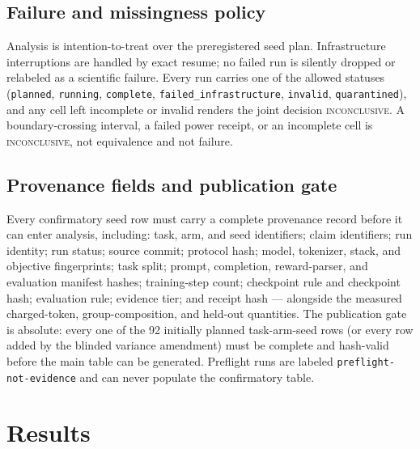 \documentclass[11pt]{article}
\begin{document}
\subsection{Failure and missingness policy}

Analysis is intention-to-treat over the preregistered seed plan. Infrastructure interruptions are handled by exact resume; no failed run is silently dropped or relabeled as a scientific failure. Every run carries one of the allowed statuses (\texttt{planned}, \texttt{running}, \texttt{complete}, \texttt{failed\_infrastructure}, \texttt{invalid}, \texttt{quarantined}), and any cell left incomplete or invalid renders the joint decision \textsc{inconclusive}. A boundary-crossing interval, a failed power receipt, or an incomplete cell is \textsc{inconclusive}, not equivalence and not failure.

\subsection{Provenance fields and publication gate}

Every confirmatory seed row must carry a complete provenance record before it can enter analysis, including: task, arm, and seed identifiers; claim identifiers; run identity; run status; source commit; protocol hash; model, tokenizer, stack, and objective fingerprints; task split; prompt, completion, reward-parser, and evaluation manifest hashes; training-step count; checkpoint rule and checkpoint hash; evaluation rule; evidence tier; and receipt hash --- alongside the measured charged-token, group-composition, and held-out quantities. The publication gate is absolute: every one of the 92 initially planned task-arm-seed rows (or every row added by the blinded variance amendment) must be complete and hash-valid before the main table can be generated. Preflight runs are labeled \texttt{preflight-not-evidence} and can never populate the confirmatory table.

\section{Results}
\label{sec:results}

\begin{center}
\end{center}
\end{document}
